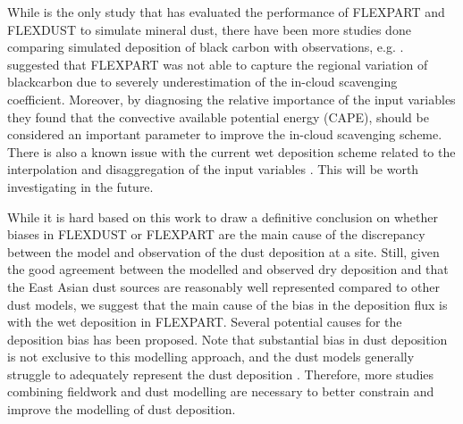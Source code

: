 While \textcite{flexdust_ref_2016} is the only study that has evaluated the performance of FLEXPART and FLEXDUST to simulate mineral dust, there have been more studies done comparing simulated deposition of black carbon with observations, e.g. \textcite{flexpart_wetdep, choi_investigation_2020}. 
\textcite{choi_investigation_2020} suggested that FLEXPART was not able to capture the regional variation of blackcarbon due to severely underestimation of the in-cloud scavenging coefficient. Moreover, by diagnosing the relative importance of the input variables 
they found that the convective available potential energy (CAPE), should be considered an important parameter to improve the in-cloud scavenging scheme. 
There is also a known issue with the current wet deposition scheme related to the interpolation and disaggregation of the input variables \parencite{tipka2021effects}. 
This will be worth investigating in the future. 



While it is hard based on this work to draw a definitive conclusion on whether biases in FLEXDUST or FLEXPART are the main cause of the discrepancy between the model and observation of the dust deposition at a site. 
Still, given the good agreement between the modelled and observed dry deposition and that the East Asian dust sources are reasonably well represented compared to other dust models, we suggest that the main cause of the bias in the deposition flux is with the wet deposition in FLEXPART. Several potential causes for the deposition bias has been proposed. Note that substantial bias in dust deposition is not exclusive to this modelling approach, and the dust models generally struggle to adequately represent the dust deposition \parencite{shao2011dust,zhang2019parameterization}. Therefore, more studies combining fieldwork and dust modelling are necessary to better constrain and improve the modelling of dust deposition.   



